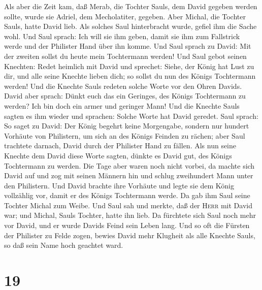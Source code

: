  Als aber die Zeit kam, daß Merab, die Tochter Sauls, dem
David gegeben werden sollte, wurde sie Adriel, dem Mecholatiter,
gegeben.  Aber Michal, die Tochter Sauls, hatte David
lieb. Als solches Saul hinterbracht wurde, gefiel ihm die Sache wohl.
 Und Saul sprach: Ich will sie ihm geben, damit sie ihm
zum Fallstrick werde und der Philister Hand über ihn komme. Und Saul
sprach zu David: Mit der zweiten sollst du heute mein Tochtermann
werden!  Und Saul gebot seinen Knechten: Redet heimlich
mit David und sprechet: Siehe, der König hat Lust zu dir, und alle seine
Knechte lieben dich; so sollst du nun des Königs Tochtermann werden!
 Und die Knechte Sauls redeten solche Worte vor den Ohren
Davids. David aber sprach: Dünkt euch das ein Geringes, des Königs
Tochtermann zu werden? Ich bin doch ein armer und geringer Mann!
 Und die Knechte Sauls sagten es ihm wieder und sprachen:
Solche Worte hat David geredet.  Saul sprach: So saget zu
David: Der König begehrt keine Morgengabe, sondern nur hundert Vorhäute
von Philistern, um sich an des Königs Feinden zu rächen; aber Saul
trachtete darnach, David durch der Philister Hand zu fällen.
 Als nun seine Knechte dem David diese Worte sagten,
dünkte es David gut, des Königs Tochtermann zu werden. 
Die Tage aber waren noch nicht vorbei, da machte sich David auf und zog
mit seinen Männern hin und schlug zweihundert Mann unter den Philistern.
Und David brachte ihre Vorhäute und legte sie dem König vollzählig vor,
damit er des Königs Tochtermann werde. Da gab ihm Saul seine Tochter
Michal zum Weibe.  Und Saul sah und merkte, daß der
\textsc{Herr} mit David war; und Michal, Sauls Tochter, hatte ihn lieb.
 Da fürchtete sich Saul noch mehr vor David, und er wurde
Davids Feind sein Leben lang.  Und so oft die Fürsten der
Philister zu Felde zogen, bewies David mehr Klugheit als alle Knechte
Sauls, so daß sein Name hoch geachtet ward.

\hypertarget{section-18}{%
\section{19}\label{section-18}}

